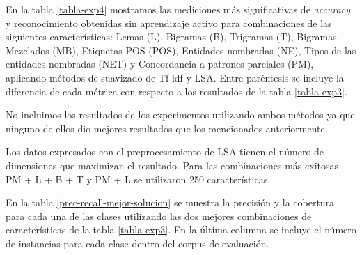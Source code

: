 En la tabla \ref{tabla-exp4} mostramos las mediciones más significativas de \textit{accuracy} y reconocimiento obtenidas sin aprendizaje activo para combinaciones de las siguientes características: Lemas (L), Bigramas (B), Trigramas (T), Bigramas Mezclados (MB), Etiquetas POS (POS), Entidades nombradas (NE), Tipos de las entidades nombradas (NET) y Concordancia a patrones parciales (PM), aplicando métodos de suavizado de Tf-idf y LSA. Entre paréntesis se incluye la diferencia de cada métrica con respecto a los resultados de la tabla \ref{tabla-exp3}.

No incluimos los resultados de los experimentos utilizando ambos métodos ya que ninguno de ellos dio mejores resultados que los mencionados anteriormente.

Los datos expresados con el preprocesamiento de LSA tienen el número de dimensiones que maximizan el resultado. Para las combinaciones más exitosas PM + L + B + T y PM + L se utilizaron 250 características.

En la tabla \ref{prec-recall-mejor-solucion} se muestra la precisión y la cobertura para cada una de las clases utilizando las dos mejores combinaciones de características de la tabla \ref{tabla-exp3}. En la última columna se incluye el número de instancias para cada clase dentro del corpus de evaluación.

